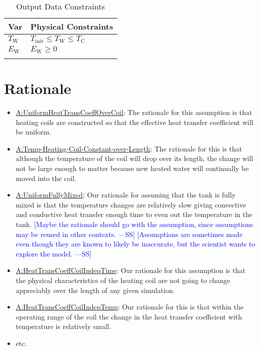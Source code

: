 \documentclass[12pt]{article}
\newcommand{\authornote}[3]{\textcolor{#1}{[#3 ---#2]}}
\newcommand{\authornote}[3]{}
\newcommand{\wss}[1]{\authornote{blue}{SS}{#1}}
\begin{document}
\begin{longtable}{l l}
\toprule
\textbf{Var} & \textbf{Physical Constraints}
\\
\midrule
\endhead
${T_{\text{W}}}$ & ${T_{\text{init}}}\leq{}{T_{\text{W}}}\leq{}{T_{\text{C}}}$
\\
${E_{\text{W}}}$ & ${E_{\text{W}}}\geq{}0$
\\
\bottomrule
\caption{Output Data Constraints}
\label{Table:OutDataConstraints}
\end{longtable}

\section{Rationale} \label{Sec:Rationale}

\begin{itemize}
\item \hyperref[assumpUnifHeatTransCoeffCoil]{A:UniformHeatTransCoeffOverCoil}:
The rationale for this assumption is that heating coils are constructed so that
the effective heat transfer coefficient will be uniform.
\item \hyperref[assumpTHCCoL]{A:Temp-Heating-Coil-Constant-over-Length}: The
rationale for this is that although the temperature of the coil will drop over
its length, the change will not be large enough to matter because new heated
water will continually be moved into the coil.
\item \hyperref[assumpFullyMixed]{A:UniformFullyMixed}: Our rationale for assuming
that the tank is fully mixed is that the temperature changes are relatively slow
giving convective and conductive heat transfer enough time to even out the
temperature in the tank.  \wss{Maybe the rationale should go with the
assumption, since assumptions may be reused in other contexts.}
\wss{Assumptions are sometimes made even though they are known to likely be
inaccurate, but the scientist wants to explore the model.}
\item \hyperref[assumpHeatTransCoilIndepTime]{A:HeatTransCoeffCoilIndepTime}:
Our rationale for this assumption is that the physical characteristics of the
heating coil are not going to change appreciably over the length of any given
simulation.
\item \hyperref[assumpHeatTransCoilIndepTemp]{A:HeatTransCoeffCoilIndepTemp}:
Our rationale for this is that within the operating range of the coil the change
in the heat transfer coefficient with temperature is relatively small.
\item etc.
\end{itemize}
        
\end{document}
